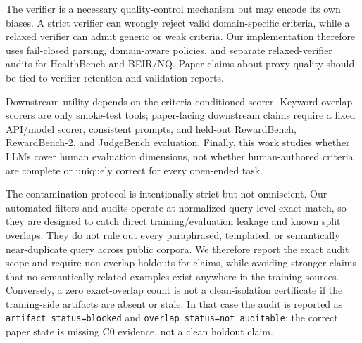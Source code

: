 The verifier is a necessary quality-control mechanism but may encode its own
biases. A strict verifier can wrongly reject valid domain-specific criteria,
while a relaxed verifier can admit generic or weak criteria. Our implementation
therefore uses fail-closed parsing, domain-aware policies, and separate
relaxed-verifier audits for HealthBench and BEIR/NQ. Paper claims about proxy
quality should be tied to verifier retention and validation reports.

Downstream utility depends on the criteria-conditioned scorer. Keyword overlap scorers are
only smoke-test tools; paper-facing downstream claims require a fixed
API/model scorer, consistent prompts, and held-out RewardBench, RewardBench-2,
and JudgeBench evaluation. Finally, this work studies whether LLMs cover human
evaluation dimensions, not whether human-authored criteria are complete or uniquely
correct for every open-ended task.

The contamination protocol is intentionally strict but not omniscient. Our
automated filters and audits operate at normalized query-level exact match, so
they are designed to catch direct training/evaluation leakage and known split
overlaps. They do not rule out every paraphrased, templated, or
semantically near-duplicate query across public corpora. We therefore report the
exact audit scope and require non-overlap holdouts for claims, while avoiding
stronger claims that no semantically related examples exist anywhere in the
training sources.
Conversely, a zero exact-overlap count is not a clean-isolation certificate if
the training-side artifacts are absent or stale. In that case the audit is
reported as \texttt{artifact\_status=blocked} and
\texttt{overlap\_status=not\_auditable}; the correct paper state is missing C0
evidence, not a clean holdout claim.
